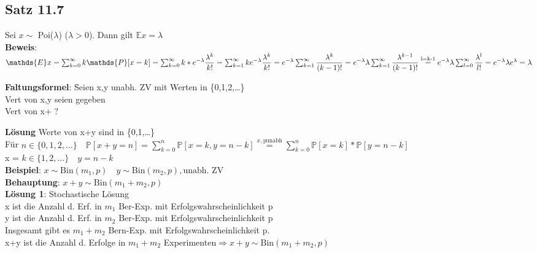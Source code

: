 \subsection{Satz 11.7}
Sei $x \sim $ Poi($ \lambda $) ($\lambda >0$). Dann gilt $\mathds{E}x= \lambda$\medskip\\
\textbf{Beweis}:\\
\begin{math}
\mathds{E}x = \sum_{k=0}^\infty k \mathds{P}[x=k]= \sum_{k=0}^\infty k *e^{-\lambda}\dfrac{\lambda^k}{k!}\smallskip\\
=\sum_{k=1}^\infty ke^{-\lambda}\dfrac{\lambda^k}{k!} = e^{-\lambda}\sum_{k=1}^\infty \dfrac{\lambda^k}{(k-1)!}\smallskip\\
=e^{-\lambda}\lambda\sum_{k=1}^\infty \dfrac{\lambda^{k-1}}{(k-1)!}\overset{\text{l=k-1}}{=} e^{-\lambda}\lambda\sum_{l=0}^{\infty}\dfrac{\lambda^l}{l!}=e^{-\lambda} \lambda e^\lambda = \lambda
\end{math}\medskip\\
\begin{tabbing}
	\textbf{Faltungsformel}: \= Seien x,y unabh. ZV mit Werten in \{0,1,2,\dots\}\\
	\> Vert von x,y seien gegeben\\
	\> Vert von x+ ?
\end{tabbing} 
\textbf{Lösung} Werte von x+y sind in \{0,1,\dots\}\smallskip\\
Für $n \in \{0,1,2,\dots\} \quad \mathds{P}[x+y=n]=\sum_{k=0}^n\mathds{P}[x=k,y=n-k] \overset{x,y \text{unabh}}{=}\sum_{k=0}^n\mathds{P}[x=k]*\mathds{P}[y=n-k]$\smallskip\\
x = $k \in \{1,2,\dots\} \quad y = n-k$\medskip\\
\textbf{Beispiel}: $x \sim \text{Bin}(m_1,p) \quad y \sim \text{Bin}(m_2,p), \text{unabh. ZV}$\smallskip\\
\textbf{Behauptung}:
$x+y \sim \text{Bin}(m_1+m_2,p)$\medskip\\
\textbf{Lösung 1}: Stochastische Lösung\\
x ist die Anzahl d. Erf. in $m_1$ Ber-Exp. mit Erfolgswahrscheinlichkeit p\\
y ist die Anzahl d. Erf. in $m_2$ Ber-Exp. mit Erfolgswahrscheinlichkeit p\smallskip\\
Insgesamt gibt es $m_1+m_2$ Bern-Exp. mit Erfolgswahrscheinlichkeit p.\\x+y ist die Anzahl d. Erfolge in $m_1+m_2$ Experimenten$ \Rightarrow x+y\sim\text{Bin}(m_1+m_2,p)$\medskip\\
